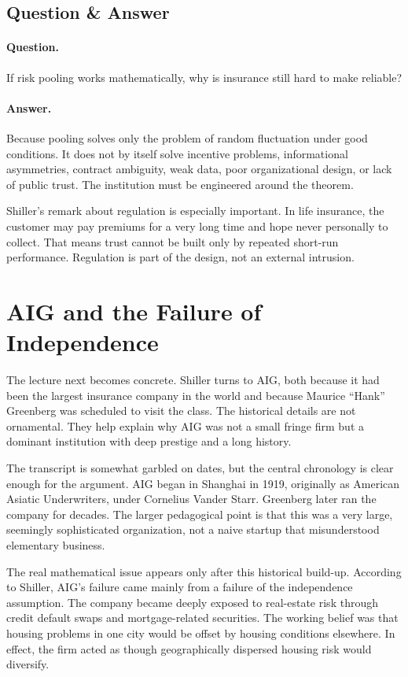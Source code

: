 \subsection{Question \& Answer}

\paragraph{Question.} If risk pooling works mathematically, why is insurance still hard to make reliable?

\paragraph{Answer.} Because pooling solves only the problem of random fluctuation under good conditions. It does not by itself solve incentive problems, informational asymmetries, contract ambiguity, weak data, poor organizational design, or lack of public trust. The institution must be engineered around the theorem.

Shiller's remark about regulation is especially important. In life insurance, the customer may pay premiums for a very long time and hope never personally to collect. That means trust cannot be built only by repeated short-run performance. Regulation is part of the design, not an external intrusion.

\section{AIG and the Failure of Independence}

The lecture next becomes concrete. Shiller turns to AIG, both because it had been the largest insurance company in the world and because Maurice ``Hank'' Greenberg was scheduled to visit the class. The historical details are not ornamental. They help explain why AIG was not a small fringe firm but a dominant institution with deep prestige and a long history.

The transcript is somewhat garbled on dates, but the central chronology is clear enough for the argument. AIG began in Shanghai in 1919, originally as American Asiatic Underwriters, under Cornelius Vander Starr. Greenberg later ran the company for decades. The larger pedagogical point is that this was a very large, seemingly sophisticated organization, not a naive startup that misunderstood elementary business.

The real mathematical issue appears only after this historical build-up. According to Shiller, AIG's failure came mainly from a failure of the independence assumption. The company became deeply exposed to real-estate risk through credit default swaps and mortgage-related securities. The working belief was that housing problems in one city would be offset by housing conditions elsewhere. In effect, the firm acted as though geographically dispersed housing risk would diversify.


